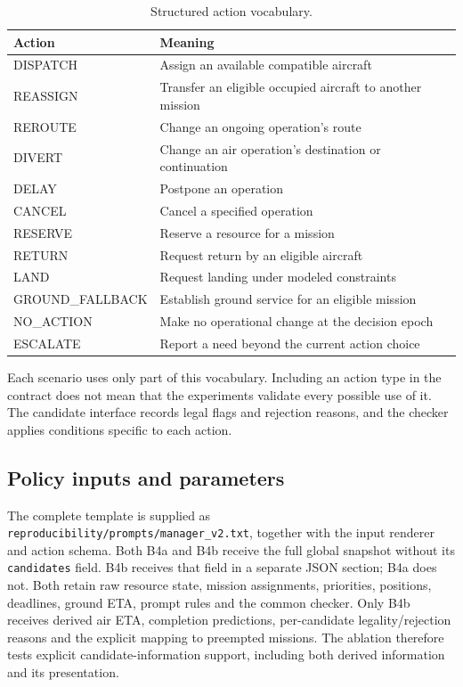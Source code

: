 \documentclass[11pt,a4paper]{article}
\begin{document}
\begin{table}[H]
\centering
\small
\setlength{\tabcolsep}{3pt}
\caption{Structured action vocabulary.}
\label{tab:S9}
\begin{tabularx}{\textwidth}{@{}lY@{}}
\toprule
Action & Meaning \\
\midrule
DISPATCH & Assign an available compatible aircraft \\
REASSIGN & Transfer an eligible occupied aircraft to another mission \\
REROUTE & Change an ongoing operation's route \\
DIVERT & Change an air operation's destination or continuation \\
DELAY & Postpone an operation \\
CANCEL & Cancel a specified operation \\
RESERVE & Reserve a resource for a mission \\
RETURN & Request return by an eligible aircraft \\
LAND & Request landing under modeled constraints \\
GROUND\_FALLBACK & Establish ground service for an eligible mission \\
NO\_ACTION & Make no operational change at the decision epoch \\
ESCALATE & Report a need beyond the current action choice \\
\bottomrule
\end{tabularx}
\end{table}

Each scenario uses only part of this vocabulary. Including an action type in the contract does not mean that the experiments validate every possible use of it. The candidate interface records legal flags and rejection reasons, and the checker applies conditions specific to each action.

\subsection{Policy inputs and parameters}

The complete template is supplied as \nolinkurl{reproducibility/prompts/manager_v2.txt}, together with the input renderer and action schema. Both B4a and B4b receive the full global snapshot without its \nolinkurl{candidates} field. B4b receives that field in a separate JSON section; B4a does not. Both retain raw resource state, mission assignments, priorities, positions, deadlines, ground ETA, prompt rules and the common checker. Only B4b receives derived air ETA, completion predictions, per-candidate legality/rejection reasons and the explicit mapping to preempted missions. The ablation therefore tests explicit candidate-information support, including both derived information and its presentation.
\end{document}
